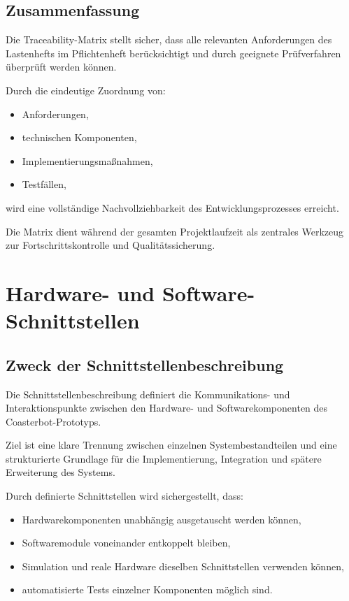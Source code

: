 \subsection{Zusammenfassung}\label{zusammenfassung-7}

Die Traceability-Matrix stellt sicher, dass alle relevanten
Anforderungen des Lastenhefts im Pflichtenheft berücksichtigt und durch
geeignete Prüfverfahren überprüft werden können.

Durch die eindeutige Zuordnung von:

\begin{itemize}
\tightlist
\item
  Anforderungen,
\item
  technischen Komponenten,
\item
  Implementierungsmaßnahmen,
\item
  Testfällen,
\end{itemize}

wird eine vollständige Nachvollziehbarkeit des Entwicklungsprozesses
erreicht.

Die Matrix dient während der gesamten Projektlaufzeit als zentrales
Werkzeug zur Fortschrittskontrolle und Qualitätssicherung.

\section{Hardware- und
Software-Schnittstellen}\label{hardware--und-software-schnittstellen}

\subsection{Zweck der
Schnittstellenbeschreibung}\label{zweck-der-schnittstellenbeschreibung}

Die Schnittstellenbeschreibung definiert die Kommunikations- und
Interaktionspunkte zwischen den Hardware- und Softwarekomponenten des
Coasterbot-Prototyps.

Ziel ist eine klare Trennung zwischen einzelnen Systembestandteilen und
eine strukturierte Grundlage für die Implementierung, Integration und
spätere Erweiterung des Systems.

Durch definierte Schnittstellen wird sichergestellt, dass:

\begin{itemize}
\tightlist
\item
  Hardwarekomponenten unabhängig ausgetauscht werden können,
\item
  Softwaremodule voneinander entkoppelt bleiben,
\item
  Simulation und reale Hardware dieselben Schnittstellen verwenden
  können,
\item
  automatisierte Tests einzelner Komponenten möglich sind.
\end{itemize}

